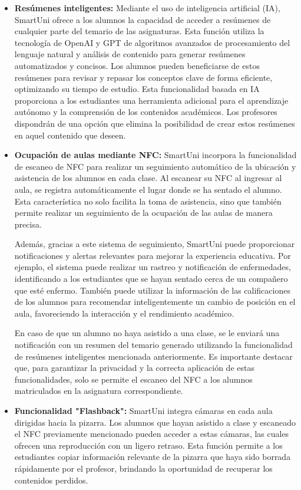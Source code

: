 \documentclass[12pt]{report}
\begin{document}
\begin{itemize}
\item \textbf{Resúmenes inteligentes:} Mediante el uso de inteligencia artificial (IA), SmartUni ofrece a los alumnos la capacidad de acceder a resúmenes de cualquier parte del temario de las asignaturas. Esta función utiliza la tecnología de OpenAI y GPT de algoritmos avanzados de procesamiento del lenguaje natural y análisis de contenido para generar resúmenes automatizados y concisos. Los alumnos pueden beneficiarse de estos resúmenes para revisar y repasar los conceptos clave de forma eficiente, optimizando su tiempo de estudio. Esta funcionalidad basada en IA proporciona a los estudiantes una herramienta adicional para el aprendizaje autónomo y la comprensión de los contenidos académicos. Los profesores dispondrán de una opción que elimina la posibilidad de crear estos resúmenes en aquel contenido que deseen.

\item \textbf{Ocupación de aulas mediante NFC:} SmartUni incorpora la funcionalidad de escaneo de NFC para realizar un seguimiento automático de la ubicación y asistencia de los alumnos en cada clase. Al escanear su NFC al ingresar al aula, se registra automáticamente el lugar donde se ha sentado el alumno. Esta característica no solo facilita la toma de asistencia, sino que también permite realizar un seguimiento de la ocupación de las aulas de manera precisa.

Además, gracias a este sistema de seguimiento, SmartUni puede proporcionar notificaciones y alertas relevantes para mejorar la experiencia educativa. Por ejemplo, el sistema puede realizar un rastreo y notificación de enfermedades, identificando a los estudiantes que se hayan sentado cerca de un compañero que esté enfermo. También puede utilizar la información de las calificaciones de los alumnos para recomendar inteligentemente un cambio de posición en el aula, favoreciendo la interacción y el rendimiento académico.

En caso de que un alumno no haya asistido a una clase, se le enviará una notificación con un resumen del temario generado utilizando la funcionalidad de resúmenes inteligentes mencionada anteriormente. Es importante destacar que, para garantizar la privacidad y la correcta aplicación de estas funcionalidades, solo se permite el escaneo del NFC a los alumnos matriculados en la asignatura correspondiente.

\item \textbf{Funcionalidad "Flashback":} SmartUni integra cámaras en cada aula dirigidas hacia la pizarra. Los alumnos que hayan asistido a clase y escaneado el NFC previamente mencionado pueden acceder a estas cámaras, las cuales ofrecen una reproducción con un ligero retraso. Esta función permite a los estudiantes copiar información relevante de la pizarra que haya sido borrada rápidamente por el profesor, brindando la oportunidad de recuperar los contenidos perdidos.


\end{itemize}
\end{document}
